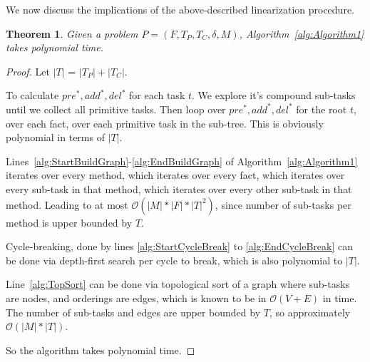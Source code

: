 \documentclass[letterpaper]{article} %
\newtheorem{theorem}{Theorem}
\newcommand{\PreS} {\ensuremath{\mathit{pre^{*}}}}
\newcommand{\AddS} {\ensuremath{\mathit{add^{*}}}}
\newcommand{\DelS} {\ensuremath{\mathit{del^{*}}}}
\begin{document}
We now discuss the implications of the above-described linearization procedure.

\begin{theorem}\label{thm:Runtime}
	Given a problem $P = (F, T_P, T_C, \delta, M)$, Algorithm~\ref{alg:Algorithm1} takes polynomial time.
\end{theorem}
\begin{proof}  %
	Let $|T|$ = $|T_P| + |T_C|$.
	
	
	
	To calculate $\PreS, \AddS, \DelS$ for each task $t$. We explore it's compound sub-tasks until we collect all primitive tasks. Then loop over $\PreS, \AddS, \DelS$ for the root $t$, over each fact, over each primitive task in the sub-tree. This is obviously polynomial in terms of $|T|$. %
	
	Lines~\ref{alg:StartBuildGraph}-\ref{alg:EndBuildGraph} of Algorithm~\ref{alg:Algorithm1} iterates over every method, which iterates over every fact, which iterates over every sub-task in that method, which iterates over every other sub-task in that method. Leading to at most $\mathcal{O}(|M| * |F| * |T|^2)$, since number of sub-tasks per method is upper bounded by $T$.
	
	Cycle-breaking, done by lines \ref{alg:StartCycleBreak} to \ref{alg:EndCycleBreak} can be done via depth-first search per cycle to break, which is also polynomial to $|T|$.
	
	Line~\ref{alg:TopSort} can be done via topological sort of a graph where sub-tasks are nodes, and orderings are edges, which is known to be in $\mathcal{O}(V+E)$ in time. %
	The number of sub-tasks and edges are upper bounded by $T$, so approximately $\mathcal{O}(|M| * |T|)$.
	
	So the algorithm takes polynomial time.
\end{proof}
\end{document}
